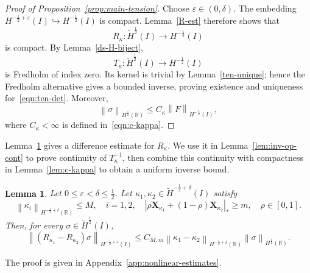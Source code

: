 \documentclass[11pt,reqno]{amsart}
\theoremstyle{plain}
\newtheorem{lemma}[theorem]{Lemma}
\theoremstyle{definition}
\numberwithin{equation}{section}
\newcommand{\paren}[1]{\left(#1\right)}
\newcommand{\wt}[1]{\widetilde{#1}}
\newcommand{\bm}[1]{\boldsymbol{#1}}
\newcommand{\abs}[1]{\left\lvert #1 \right\rvert}
\newcommand{\norm}[1]{\left\lVert #1 \right\rVert}
\newcommand{\R}{\mathbb{R}}
\newcommand{\xka}[1]{\bm X_{\kappa_{#1}}}
\newcommand{\hi}[1]{H^{#1}(I)}
\newcommand{\thi}[1]{\wt H^{#1}(I)}
\newcommand{\hr}[1]{H^{#1}(\R)}
\begin{document}
\begin{proof}[Proof of
Proposition~\ref{prop:main-tension}]
Choose $\varepsilon\in(0,\delta)$.  The embedding
$\hi{-\frac{1}{2}+\varepsilon}\hookrightarrow\hi{-\frac{1}{2}}$ is
compact.  Lemma~\ref{R-est} therefore shows that
\begin{equation}
    R_\kappa:\thi{\frac{1}{2}}\to\hi{-\frac{1}{2}}
\end{equation}
is compact.  By Lemma~\ref{ds-H-biject},
\begin{equation}
    T_\kappa:
    \thi{\frac{1}{2}}\to\hi{-\frac{1}{2}}
\end{equation}
is Fredholm of index zero.  Its kernel is trivial by
Lemma~\ref{ten-unique}; hence the Fredholm alternative gives a bounded
inverse, proving existence and uniqueness for~\eqref{eqn:ten-det}.
Moreover,
\begin{equation}\label{eqn:sigma-H12}
    \norm{\sigma}_{\hr{\frac{1}{2}}}
    \le C_\kappa \norm{F}_{\hi{-\frac{1}{2}}},
\end{equation}
where $C_\kappa<\infty$ is defined in~\eqref{eqn:c-kappa}.
\end{proof}

Lemma~\ref{R-Lip} gives a difference estimate for $R_\kappa$.
We use it in Lemma~\ref{lem:inv-op-cont} to prove continuity of $T_\kappa^{-1}$,
then combine this continuity with compactness in Lemma~\ref{lem:c-kappa}
to obtain a uniform inverse bound.

\begin{lemma}\label{R-Lip}
Let $0\le \varepsilon<\delta\le \frac{1}{2}$.
Let $\kappa_1,\kappa_2 \in \thi{-\frac{1}{2}+\delta}$ satisfy
\begin{equation*}
    \norm{\kappa_i}_{\hr{-\frac{1}{2}+\delta}}\le M,
    \quad i=1,2,
    \quad
    \abs{\rho \xka{1} + \paren{1-\rho}\xka{2}}_*\ge m,
    \quad \rho\in[0,1].
\end{equation*}
Then, for every $\sigma\in\thi{\frac12}$,
\begin{equation}\label{eqn:R-curvature-difference}
    \norm{\paren{R_{\kappa_1} - R_{\kappa_2}} \sigma}_{\hi{-\frac{1}{2}+\varepsilon}} \le C_{M,m} \norm{\kappa_1-\kappa_2}_{\hr{-\frac{1}{2}+\delta}} \norm{\sigma}_{\hr{\frac{1}{2}}}.
\end{equation}
\end{lemma}

The proof is given in Appendix~\ref{app:nonlinear-estimates}.
\end{document}
